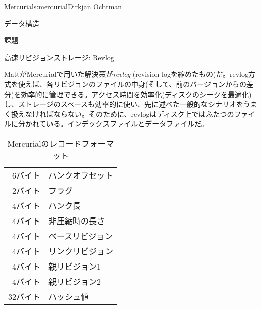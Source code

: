 \begin{aosachapter}{Mercurial}{s:mercurial}{Dirkjan Ochtman}
\begin{aosasect1}{データ構造}
\begin{aosasect2}{課題}
\end{aosasect2}

\begin{aosasect2}{高速リビジョンストレージ: Revlog}

MattがMercurialで用いた解決策が\emph{revlog} (revision logを縮めたもの)だ。revlog方式を使えば、各リビジョンのファイルの中身(そして、前のバージョンからの差分)を効率的に管理できる。アクセス時間を効率化(ディスクのシークを最適化)し、ストレージのスペースも効率的に使い、先に述べた一般的なシナリオをうまく扱えなければならない。そのために、revlogはディスク上ではふたつのファイルに分かれている。インデックスファイルとデータファイルだ。

\begin{table}[h!]
  \centering
  \begin{tabular}{|rl|}
    \hline
    6バイト & ハンクオフセット \\
    2バイト & フラグ \\
    4バイト & ハンク長 \\
    4バイト & 非圧縮時の長さ \\
    4バイト & ベースリビジョン \\
    4バイト & リンクリビジョン \\
    4バイト & 親リビジョン1 \\
    4バイト & 親リビジョン2 \\
    32バイト & ハッシュ値 \\
    \hline
  \end{tabular}
  \caption{Mercurialのレコードフォーマット}
  \label{tbl.hg.records}
\end{table}


\end{aosasect2}
\end{aosasect1}
\end{aosachapter}
